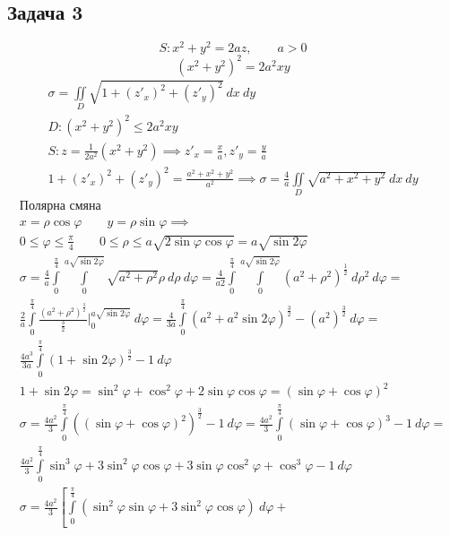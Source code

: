 \documentclass[a4paper,fleqn,12pt]{article}
\theoremstyle{definition}
\begin{document}
\subsection*{Задача 3}
$$S: x^2 + y^2 = 2az, \qquad a>0$$
$$(x^2 + y^2)^2 = 2a^2xy$$
\begin{gather*}
\sigma = \iint\limits_{D} \sqrt{1 + (z'_x)^2 + (z'_y)^2} \ dx \ dy \\
D: (x^2 + y^2)^2 \leq 2a^2xy \\
S: z = \frac{1}{2a^2} (x^2 + y^2) \implies z'_x = \frac{x}{a}, z'_y = \frac{y}{a} \\
1 + (z'_x)^2 + (z'_y)^2 = \frac{a^2 + x^2 + y^2}{a^2} \implies
\sigma = \frac{4}{a} \iint\limits_{D} \sqrt{a^2 + x^2 + y^2} \ dx \ dy 
\end{gather*}
\begin{gather*}
\text{Полярна смяна} \\
x = \rho \cos \varphi \qquad y = \rho \sin \varphi \implies \\
0 \leq \varphi \leq \frac{\pi}{4} \qquad 0 \leq \rho \leq a\sqrt{2\sin\varphi \cos\varphi} = a\sqrt{\sin 2\varphi}\\
\sigma = \frac{4}{a} \int\limits_0 ^{\frac{\pi}{4}} \int\limits_0 ^{a\sqrt{\sin 2\varphi}} \sqrt{a^2 + \rho^2} \rho \ d\rho \ d \varphi  = \frac{4}{a2} \int\limits_0 ^{\frac{\pi}{4}} \int\limits_0 ^{a\sqrt{\sin 2\varphi}} (a^2 + \rho^2)^\frac{1}{2} \ d\rho^2  \ d \varphi  = \\
\frac{2}{a} \int\limits_0 ^{\frac{\pi}{4}} \frac{(a^2 + \rho^2 )^\frac{3}{2}}{\frac{3}{2}} \Big|_0 ^{a\sqrt{\sin 2\varphi}}  \ d \varphi =
\frac{4}{3a} \int\limits_0 ^{\frac{\pi}{4}} (a^2 + a^2 \sin 2\varphi)^\frac{3}{2} - (a^2)^\frac{3}{2}  \ d \varphi = \\
\frac{4a^3}{3a} \int\limits_0 ^{\frac{\pi}{4}} (1+ \sin 2\varphi)^\frac{3}{2} - 1 \ d \varphi \\
1+ \sin 2\varphi = \sin^2 \varphi + \cos^2 \varphi + 2\sin\varphi \cos\varphi = (\sin\varphi + \cos\varphi)^2 \\
\sigma = \frac{4a^2}{3} \int\limits_0 ^{\frac{\pi}{4}} ((\sin\varphi + \cos\varphi)^2)^\frac{3}{2} - 1 \ d \varphi = \frac{4a^2}{3} \int\limits_0 ^{\frac{\pi}{4}} (\sin\varphi + \cos\varphi)^3 - 1 \ d \varphi = \\
\frac{4a^2}{3} \int\limits_0 ^{\frac{\pi}{4}} \sin^3 \varphi + 3\sin^2\varphi \cos\varphi + 3\sin\varphi \cos^2\varphi + \cos^3 \varphi - 1 \ d \varphi \\
\sigma = \frac{4a^2}{3} 
\left[ 
\int\limits_0 ^{\frac{\pi}{4}} \left( \sin^2\varphi \sin\varphi + 3\sin^2\varphi\cos\varphi\right) \ d \varphi+ 

\end{gather*}
\end{document}
